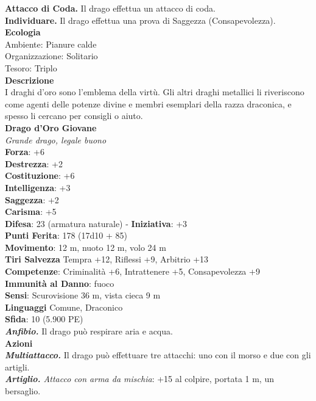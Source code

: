 \begin{multicols}{2}
\textbf{Attacco di Coda.} Il drago effettua un attacco di coda.\\
\textbf{Individuare.} Il drago effettua una prova di Saggezza (Consapevolezza).\\
\textbf{Ecologia}\\
Ambiente: Pianure calde\\
Organizzazione: Solitario\\
Tesoro: Triplo\\
\textbf{Descrizione}\\
I draghi d'oro sono l'emblema della virtù. Gli altri draghi metallici li riveriscono come agenti delle potenze divine e membri esemplari della razza draconica, e spesso li cercano per consigli o aiuto.\\
\medskip\textbf{Drago d'Oro Giovane}\\
\emph{Grande drago, legale buono}\\
\textbf{Forza}: +6\\
\textbf{Destrezza}: +2\\
\textbf{Costituzione}: +6\\
\textbf{Intelligenza}: +3\\
\textbf{Saggezza}: +2\\
\textbf{Carisma}: +5\\
\textbf{Difesa}: 23 (armatura naturale) - \textbf{Iniziativa}: +3\\
\textbf{Punti Ferita}: 178 (17d10 + 85)\\
\textbf{Movimento}: 12 m, nuoto 12 m, volo 24 m\\
\textbf{Tiri Salvezza} Tempra +12, Riflessi +9, Arbitrio +13\\
\textbf{Competenze}: Criminalità +6, Intrattenere +5, Consapevolezza +9 \\
\textbf{Immunità al Danno}: fuoco\\
\textbf{Sensi}: Scurovisione 36 m, vista cieca 9 m\\
\textbf{Linguaggi} Comune, Draconico\\
\textbf{Sfida}: 10 (5.900 PE)\smallskip\\
\emph{\textbf{Anfibio.}} Il drago può respirare aria e acqua.\\
\smallskip\textbf{Azioni}\\
\emph{\textbf{Multiattacco.}} Il drago può effettuare tre attacchi: uno con il morso e due con gli artigli.\\
\emph{\textbf{Artiglio.} Attacco con arma da mischia}: +15 al colpire, portata 1 m, un bersaglio.\\

\end{multicols}
